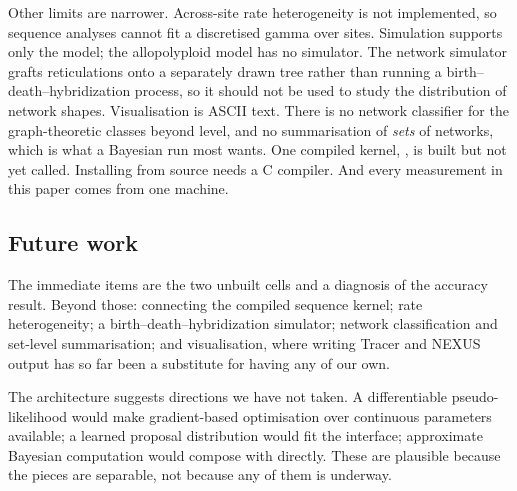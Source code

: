 Other limits are narrower. Across-site rate heterogeneity is not implemented, so
sequence analyses cannot fit a discretised gamma over sites. Simulation supports
only the  model; the allopolyploid model has no simulator. The network
simulator grafts reticulations onto a separately drawn tree rather than running a
birth--death--hybridization process, so it should not be used to study the
distribution of network shapes. Visualisation is ASCII text. There is no network
classifier for the graph-theoretic classes beyond level, and no summarisation of
\emph{sets} of networks, which is what a Bayesian run most wants. One compiled
kernel, , is built but not yet called. Installing from source
needs a C compiler. And every measurement in this paper comes from one machine.

\subsection{Future work}

The immediate items are the two unbuilt cells and a diagnosis of the accuracy
result. Beyond those: connecting the compiled sequence kernel; rate
heterogeneity; a birth--death--hybridization simulator; network classification
and set-level summarisation; and visualisation, where writing Tracer and NEXUS
output has so far been a substitute for having any of our own.

The architecture suggests directions we have not taken. A differentiable
pseudo-likelihood would make gradient-based optimisation over continuous
parameters available; a learned proposal distribution would fit the
 interface; approximate Bayesian computation would compose
with  directly. These are plausible because the pieces are
separable, not because any of them is underway.
